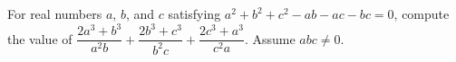 For real numbers $a$, $b$, and $c$ satisfying $a^{2}+b^{2}+c^{2}-ab-ac-bc=0$, compute the value of $\dfrac{2a^{3}+b^{3}}{a^{2}b}+\dfrac{2b^{3}+c^{3}}{b^{2}c}+\dfrac{2c^{3}+a^{3}}{c^{2}a}$.  Assume $abc\ne0$.
